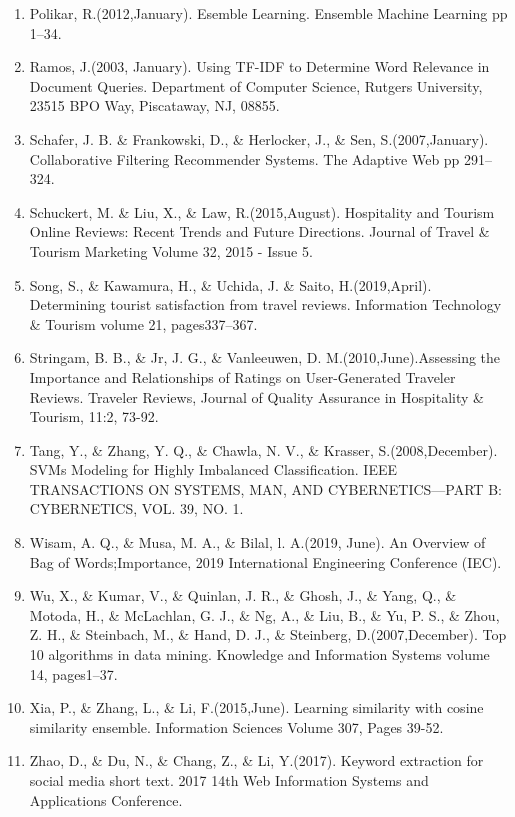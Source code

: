 \begin{enumerate}
\item Polikar, R.(2012,January). Esemble Learning. Ensemble Machine Learning pp 1–34.

\item Ramos, J.(2003, January). Using TF-IDF to Determine Word Relevance in Document Queries. Department of Computer Science, Rutgers University, 23515 BPO Way, Piscataway, NJ, 08855.

\item Schafer, J. B. \& Frankowski, D., \& Herlocker, J., \& Sen, S.(2007,January). Collaborative Filtering Recommender Systems. The Adaptive Web pp 291–324.

\item Schuckert, M. \& Liu, X., \& Law, R.(2015,August). Hospitality and Tourism Online Reviews: Recent Trends and Future Directions. Journal of Travel \& Tourism Marketing Volume 32, 2015 - Issue 5.

\newpage

\item Song, S., \& Kawamura, H., \& Uchida, J. \& Saito, H.(2019,April). Determining tourist satisfaction from travel reviews. Information Technology \& Tourism volume 21, pages337–367.

\item Stringam, B. B., \& Jr, J. G., \& Vanleeuwen, D. M.(2010,June).Assessing the Importance and Relationships of Ratings on User-Generated Traveler Reviews. Traveler Reviews, Journal of Quality Assurance in Hospitality \& Tourism, 11:2, 73-92.

\item Tang, Y., \& Zhang, Y. Q., \& Chawla, N. V., \&  Krasser, S.(2008,December). SVMs Modeling for Highly Imbalanced Classification. IEEE TRANSACTIONS ON SYSTEMS, MAN, AND CYBERNETICS—PART B: CYBERNETICS, VOL. 39, NO. 1.


\item Wisam, A. Q., \& Musa, M. A., \& Bilal, l. A.(2019, June). An Overview of Bag of Words;Importance, 2019 International Engineering Conference (IEC).

\item Wu, X., \& Kumar, V., \& Quinlan, J. R., \& Ghosh, J., \& Yang, Q., \& Motoda, H., \& McLachlan, G. J., \& Ng, A., \& Liu, B., \& Yu, P. S., \& Zhou, Z. H., \& Steinbach, M., \& Hand, D. J., \& Steinberg, D.(2007,December). Top 10 algorithms in data mining. Knowledge and Information Systems volume 14, pages1–37.

\item Xia, P., \& Zhang, L., \& Li, F.(2015,June). Learning similarity with cosine similarity ensemble. Information Sciences Volume 307, Pages 39-52.

\item Zhao, D., \& Du, N., \& Chang, Z., \& Li, Y.(2017). Keyword extraction for social media short text. 2017 14th Web Information Systems and Applications Conference.

\end{enumerate}
%